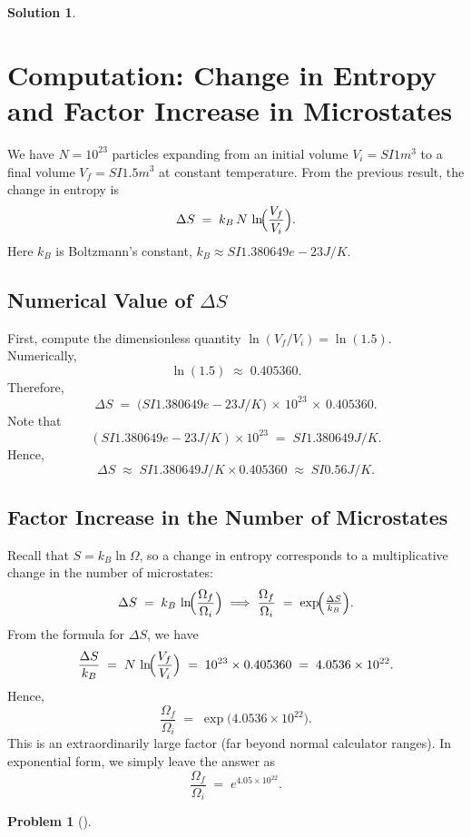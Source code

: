\documentclass[12pt]{article}
\theoremstyle{definition} %
\newtheorem{solution}{Solution}
\newtheorem{problem}{Problem}
\theoremstyle{plain} %
\begin{document}
\begin{solution}
    
\section*{Computation: Change in Entropy and Factor Increase in Microstates}

We have $N = 10^{23}$ particles expanding from an initial volume 
$V_i = SI{1}{m^3}$ to a final volume $V_f = SI{1.5}{m^3}$ at constant temperature. 
From the previous result, the change in entropy is
\[
\Delta S \;=\; k_B\,N \,\ln\!\Bigl(\frac{V_f}{V_i}\Bigr).
\]
Here $k_B$ is Boltzmann's constant, $k_B \approx SI{1.380649e-23}{J/K}$. 

\subsection*{Numerical Value of $\Delta S$}

First, compute the dimensionless quantity 
\(\ln(V_f/V_i) = \ln(1.5)\). Numerically,
\[
\ln(1.5) \;\approx\; 0.405360.
\]
Therefore,
\[
\Delta S \;=\; \bigl(SI{1.380649e-23}{J/K}\bigr)\,\times\,10^{23}\,
\times\,0.405360.
\]
Note that
\[
(SI{1.380649e-23}{J/K}) \times 10^{23} \;=\; SI{1.380649}{J/K}.
\]
Hence,
\[
\Delta S \;\approx\; SI{1.380649}{J/K} \times 0.405360 
\;\approx\; SI{0.56}{J/K}.
\]

\subsection*{Factor Increase in the Number of Microstates}

Recall that $S = k_B \ln\Omega$, so a change in entropy corresponds to 
a multiplicative change in the number of microstates:
\[
\Delta S \;=\; k_B \,\ln\!\Bigl(\frac{\Omega_f}{\Omega_i}\Bigr)
\;\Longrightarrow\;
\frac{\Omega_f}{\Omega_i} \;=\; \exp\!\Bigl(\tfrac{\Delta S}{k_B}\Bigr).
\]
From the formula for $\Delta S$, we have
\[
\frac{\Delta S}{k_B} \;=\; N \,\ln\!\Bigl(\frac{V_f}{V_i}\Bigr)
\;=\; 10^{23} \times 0.405360 
\;=\; 4.0536 \times 10^{22}.
\]
Hence,
\[
\frac{\Omega_f}{\Omega_i}
\;=\;
\exp\bigl(4.0536\times 10^{22}\bigr).
\]
This is an extraordinarily large factor (far beyond normal 
calculator ranges).  In exponential form, we simply leave the answer as
\[
\frac{\Omega_f}{\Omega_i}
\;=\;
e^{4.05\times 10^{22}}.
\]
\end{solution}
\begin{problem}[]
    
\end{problem}
\end{document}
